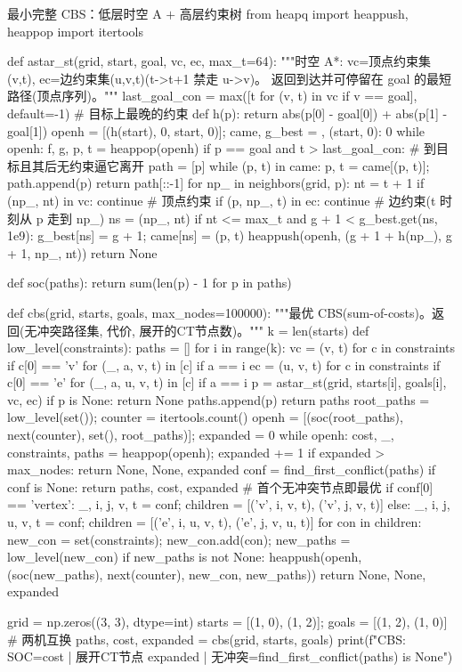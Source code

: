 \begin{codebox}[Python]{最小完整 CBS：低层时空 A\* $+$ 高层约束树}
from heapq import heappush, heappop
import itertools

def astar_st(grid, start, goal, vc, ec, max_t=64):
    """时空 A*: vc=顶点约束集{(v,t)}, ec=边约束集{(u,v,t)}(t->t+1 禁走 u->v)。
    返回到达并可停留在 goal 的最短路径(顶点序列)。"""
    last_goal_con = max([t for (v, t) in vc if v == goal], default=-1)   # 目标上最晚的约束
    def h(p): return abs(p[0] - goal[0]) + abs(p[1] - goal[1])
    openh = [(h(start), 0, start, 0)]; came, g_best = {}, {(start, 0): 0}
    while openh:
        f, g, p, t = heappop(openh)
        if p == goal and t > last_goal_con:                # 到目标且其后无约束逼它离开
            path = [p]
            while (p, t) in came: p, t = came[(p, t)]; path.append(p)
            return path[::-1]
        for np_ in neighbors(grid, p):
            nt = t + 1
            if (np_, nt) in vc: continue                   # 顶点约束
            if (p, np_, t) in ec: continue                 # 边约束(t 时刻从 p 走到 np_)
            ns = (np_, nt)
            if nt <= max_t and g + 1 < g_best.get(ns, 1e9):
                g_best[ns] = g + 1; came[ns] = (p, t)
                heappush(openh, (g + 1 + h(np_), g + 1, np_, nt))
    return None

def soc(paths): return sum(len(p) - 1 for p in paths)

def cbs(grid, starts, goals, max_nodes=100000):
    """最优 CBS(sum-of-costs)。返回(无冲突路径集, 代价, 展开的CT节点数)。"""
    k = len(starts)
    def low_level(constraints):
        paths = []
        for i in range(k):
            vc = {(v, t) for c in constraints if c[0] == 'v' for (_, a, v, t) in [c] if a == i}
            ec = {(u, v, t) for c in constraints if c[0] == 'e' for (_, a, u, v, t) in [c] if a == i}
            p = astar_st(grid, starts[i], goals[i], vc, ec)
            if p is None: return None
            paths.append(p)
        return paths
    root_paths = low_level(set()); counter = itertools.count()
    openh = [(soc(root_paths), next(counter), set(), root_paths)]; expanded = 0
    while openh:
        cost, _, constraints, paths = heappop(openh); expanded += 1
        if expanded > max_nodes: return None, None, expanded
        conf = find_first_conflict(paths)
        if conf is None: return paths, cost, expanded       # 首个无冲突节点即最优
        if conf[0] == 'vertex':
            _, i, j, v, t = conf; children = [('v', i, v, t), ('v', j, v, t)]
        else:
            _, i, j, u, v, t = conf; children = [('e', i, u, v, t), ('e', j, v, u, t)]
        for con in children:
            new_con = set(constraints); new_con.add(con); new_paths = low_level(new_con)
            if new_paths is not None:
                heappush(openh, (soc(new_paths), next(counter), new_con, new_paths))
    return None, None, expanded

grid = np.zeros((3, 3), dtype=int)
starts = [(1, 0), (1, 2)]; goals = [(1, 2), (1, 0)]         # 两机互换
paths, cost, expanded = cbs(grid, starts, goals)
print(f"CBS: SOC={cost} | 展开CT节点 {expanded} | 无冲突={find_first_conflict(paths) is None}")
\end{codebox}

